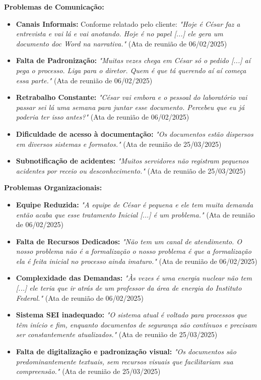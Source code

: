 \documentclass[12pt,a4paper]{article}
\begin{document}
\textbf{Problemas de Comunicação:}
\begin{itemize}
    \item \textbf{Canais Informais:} Conforme relatado pelo cliente: \textit{"Hoje é César faz a entrevista e vai lá e vai anotando. Hoje é no papel [...] ele gera um documento doc Word na narrativa."} (Ata de reunião de 06/02/2025)
    
    \item \textbf{Falta de Padronização:} \textit{"Muitas vezes chega em César só o pedido [...] aí pega o processo. Liga para o diretor. Quem é que tá querendo aí aí começa essa parte."} (Ata de reunião de 06/02/2025)
    
    \item \textbf{Retrabalho Constante:} \textit{"César vai embora e o pessoal do laboratório vai passar sei lá uma semana para juntar esse documento. Percebeu que eu já poderia ter isso antes?"} (Ata de reunião de 06/02/2025)
    
    \item \textbf{Dificuldade de acesso à documentação:} \textit{"Os documentos estão dispersos em diversos sistemas e formatos."} (Ata de reunião de 25/03/2025)
    
    \item \textbf{Subnotificação de acidentes:} \textit{"Muitos servidores não registram pequenos acidentes por receio ou desconhecimento."} (Ata de reunião de 25/03/2025)
\end{itemize}

\textbf{Problemas Organizacionais:}
\begin{itemize}
    \item \textbf{Equipe Reduzida:} \textit{"A equipe de César é pequena e ele tem muita demanda então acaba que esse tratamento Inicial [...] é um problema."} (Ata de reunião de 06/02/2025)
    
    \item \textbf{Falta de Recursos Dedicados:} \textit{"Não tem um canal de atendimento. O nosso problema não é a formalização o nosso problema é que a formalização ela é feita inicial no processo ainda imaturo."} (Ata de reunião de 06/02/2025)
    
    \item \textbf{Complexidade das Demandas:} \textit{"Às vezes é uma energia nuclear não tem [...] ele teria que ir atrás de um professor da área de energia do Instituto Federal."} (Ata de reunião de 06/02/2025)
    
    \item \textbf{Sistema SEI inadequado:} \textit{"O sistema atual é voltado para processos que têm início e fim, enquanto documentos de segurança são contínuos e precisam ser constantemente atualizados."} (Ata de reunião de 25/03/2025)
    
    \item \textbf{Falta de digitalização e padronização visual:} \textit{"Os documentos são predominantemente textuais, sem recursos visuais que facilitariam sua compreensão."} (Ata de reunião de 25/03/2025)
\end{itemize}
\end{document}
